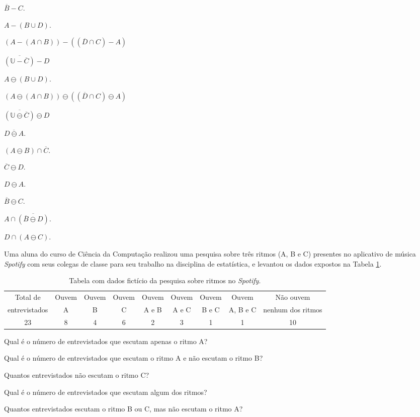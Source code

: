 \begin{exerList}
	\item $\overline{B} - C$.
	\item $A - (B \cup D)$.
	\item $(A - (A \cap B)) - ((\overline{D} \cap C) - A)$
	\item $\overline{(\mathbb{U} - \overline{C})} - D$
	\item $A \ominus (B \cup D)$.
	\item $(A \ominus (A \cap B)) \ominus ((\overline{D} \cap C) \ominus A)$
	\item $\overline{(\mathbb{U} \ominus \overline{C})} \ominus D$
	\item $\overline{D \ominus A}$.
	\item $(A \ominus B) \cap \overline{C}$.
	\item $\overline{C} \ominus D$.
	\item $D \ominus A$.
	\item $\overline{B} \ominus C$.
	\item $A \cap \overline{(\overline{B} \ominus D)}$.
	\item $D \cap (A \ominus C)$.
\end{exerList}

\begin{problem}\label{prob:Conjuntos11}
	Uma aluna do curso de Ciência da Computação realizou uma pesquisa sobre três ritmos (A, B e C) presentes no aplicativo de música \textit{Spotify} com seus colegas de classe para seu trabalho na disciplina de estatística,  e levantou os dados expostos na Tabela \ref{tab:TabelaDeDados}.
\end{problem}

\begin{table}[h]
	\centering
	\begin{tabular}{ccccccccc}
		\hline
		Total de & Ouvem & Ouvem & Ouvem & Ouvem & Ouvem &  Ouvem & Ouvem &   Não ouvem \\
		entrevistados & A & B & C & A e B & A e C & B e C & A, B e C & nenhum dos ritmos  \\
		\hline
		23 & 8 & 4 & 6 & 2 & 3 & 1 & 1 & 10\\
		\hline
	\end{tabular}
	\caption{Tabela com dados fictício da pesquisa sobre ritmos no \textit{Spotify}.}
	\label{tab:TabelaDeDados}
\end{table}

\begin{exerList}
	\item Qual é o número de entrevistados que escutam apenas o ritmo A?
	\item Qual é o número de entrevistados que escutam o ritmo A e não escutam o ritmo B?
	\item Quantos entrevistados não escutam o ritmo C?
	\item Qual é o número de entrevistados que escutam algum dos ritmos? 
	\item Quantos entrevistados escutam o ritmo B ou C, mas não escutam o ritmo A?
\end{exerList}

